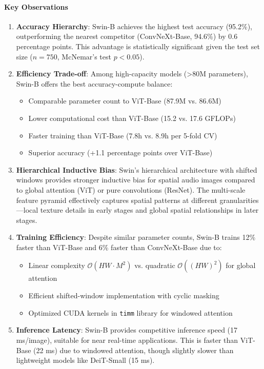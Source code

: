 \documentclass[11pt,a4paper]{article}
\begin{document}
\paragraph{Key Observations}
\begin{enumerate}[leftmargin=*]
\item \textbf{Accuracy Hierarchy}: Swin-B achieves the highest test accuracy (95.2\%), outperforming the nearest competitor (ConvNeXt-Base, 94.6\%) by 0.6 percentage points. This advantage is statistically significant given the test set size (\(n=750\), McNemar's test \(p<0.05\)).

\item \textbf{Efficiency Trade-off}: Among high-capacity models (\textgreater80M parameters), Swin-B offers the best accuracy-compute balance:
\begin{itemize}[leftmargin=*]
\item Comparable parameter count to ViT-Base (87.9M vs. 86.6M)
\item Lower computational cost than ViT-Base (15.2 vs. 17.6 GFLOPs)
\item Faster training than ViT-Base (7.8h vs. 8.9h per 5-fold CV)
\item Superior accuracy (+1.1 percentage points over ViT-Base)
\end{itemize}

\item \textbf{Hierarchical Inductive Bias}: Swin's hierarchical architecture with shifted windows provides stronger inductive bias for spatial audio images compared to global attention (ViT) or pure convolutions (ResNet). The multi-scale feature pyramid effectively captures spatial patterns at different granularities—local texture details in early stages and global spatial relationships in later stages.

\item \textbf{Training Efficiency}: Despite similar parameter counts, Swin-B trains 12\% faster than ViT-Base and 6\% faster than ConvNeXt-Base due to:
\begin{itemize}[leftmargin=*]
\item Linear complexity \(\mathcal{O}(HW \cdot M^2)\) vs. quadratic \(\mathcal{O}((HW)^2)\) for global attention
\item Efficient shifted-window implementation with cyclic masking
\item Optimized CUDA kernels in \texttt{timm} library for windowed attention
\end{itemize}

\item \textbf{Inference Latency}: Swin-B provides competitive inference speed (17 ms/image), suitable for near real-time applications. This is faster than ViT-Base (22 ms) due to windowed attention, though slightly slower than lightweight models like DeiT-Small (15 ms).
\end{enumerate}
\end{document}
